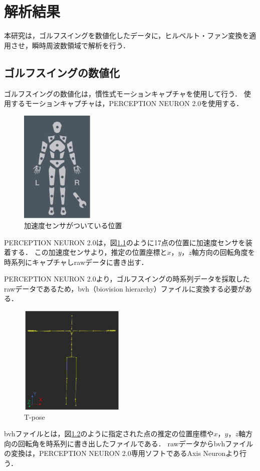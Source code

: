 \chapter{解析結果}
本研究は，ゴルフスイングを数値化したデータに，ヒルベルト・ファン変換を適用させ，瞬時周波数領域で解析を行う．

\section{ゴルフスイングの数値化}
ゴルフスイングの数値化は，慣性式モーションキャプチャを使用して行う．
使用するモーションキャプチャは，PERCEPTION NEURON 2.0を使用する．
\begin{figure}
    \begin{center}
        \includegraphics[width=3.5cm]{./images/sensors.png}
        \caption{加速度センサがついている位置}
        \label{sensors}
    \end{center}
\end{figure}
PERCEPTION NEURON 2.0は，図\ref{sensors}のように17点の位置に加速度センサを装着する．
この加速度センサより，推定の位置座標と$x$，$y$，$z$軸方向の回転角度を時系列にキャプチャしrawデータに書き出す．

PERCEPTION NEURON 2.0より，ゴルフスイングの時系列データを採取したrawデータであるため，bvh（biovision hierarchy）ファイルに変換する必要がある．
\begin{figure}
    \begin{center}
        \includegraphics[width=5cm]{./images/Tpose.png}
        \caption{T-pose}
        \label{tpose}
    \end{center}
\end{figure}
bvhファイルとは，図\ref{tpose}のように指定された点の推定の位置座標や$x$，$y$，$z$軸方向の回転角を時系列に書き出したファイルである．
rawデータからbvhファイルの変換は，PERCEPTION NEURON 2.0専用ソフトであるAxis Neuronより行う．


